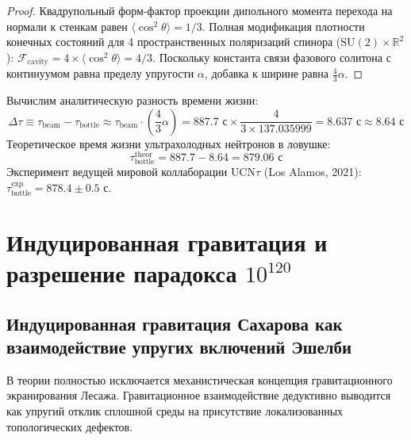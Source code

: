 \documentclass[12pt,a4paper]{article}
\begin{document}
	\begin{proof}
		Квадрупольный форм-фактор проекции дипольного момента перехода на нормали к стенкам равен $\langle \cos^2\theta \rangle = 1/3$. Полная модификация плотности конечных состояний для 4 пространственных поляризаций спинора ($\mathrm{SU}(2) \times \mathbb{R}^2$): $\mathcal{F}_{\text{cavity}} = 4 \times \langle \cos^2\theta \rangle = 4/3$. Поскольку константа связи фазового солитона с континуумом равна пределу упругости $\alpha$, добавка к ширине равна $\frac{4}{3}\alpha$.
	\end{proof}
	
	Вычислим аналитическую разность времени жизни:
	\begin{equation}
		\Delta \tau \equiv \tau_{\text{beam}} - \tau_{\text{bottle}} \approx \tau_{\text{beam}} \cdot \left( \frac{4}{3} \alpha \right) = 887.7 \text{ с} \times \frac{4}{3 \times 137.035999} = \mathbf{8.637 \text{ с}} \approx \mathbf{8.64 \text{ с}}
	\end{equation}
	Теоретическое время жизни ультрахолодных нейтронов в ловушке:
	\begin{equation}
		\tau_{\text{bottle}}^{\text{theor}} = 887.7 - 8.64 = \mathbf{879.06 \text{ с}}
	\end{equation}
	Эксперимент ведущей мировой коллаборации $\text{UCN}\tau$ (Los Alamos, 2021): $\tau_{\text{bottle}}^{\text{exp}} = \mathbf{878.4 \pm 0.5 \text{ с}}$.
	
	\section{Индуцированная гравитация и разрешение парадокса $10^{120}$}
	
	\subsection{Индуцированная гравитация Сахарова как взаимодействие упругих включений Эшелби}
	
	В теории полностью исключается механистическая концепция гравитационного экранирования Лесажа. Гравитационное взаимодействие дедуктивно выводится как упругий отклик сплошной среды на присутствие локализованных топологических дефектов.
	
\end{document}

